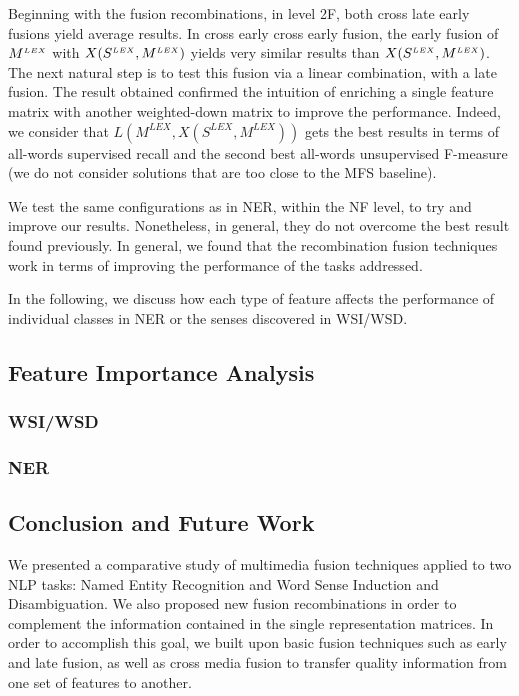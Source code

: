Beginning with the fusion recombinations, in level 2F, both cross late early fusions yield average results. In cross early cross early fusion, the early fusion of $M^{\scriptscriptstyle LEX}$ with  $X(S^{\scriptscriptstyle LEX}, M^{\scriptscriptstyle LEX})$ yields very similar results than $X(S^{\scriptscriptstyle LEX}, M^{\scriptscriptstyle LEX})$. The next natural step is to test this fusion via a linear combination, with a late fusion. The result obtained confirmed the intuition of enriching a single feature matrix with another weighted-down matrix to improve the performance. Indeed, we consider that $L(M^{LEX}, X(S^{LEX}, M^{LEX}))$ gets the best results in terms of all-words supervised recall and the second best all-words unsupervised F-measure (we do not consider solutions that are too close to the MFS baseline). 

We test the same configurations as in NER, within the NF level, to try and improve our results. Nonetheless, in general, they do not overcome the best result found previously.
In general, we found that the recombination fusion techniques work in terms of improving the performance of the tasks addressed.

In the following, we discuss how each type of feature affects the performance of individual classes in NER or the senses discovered in WSI/WSD.

\subsection{Feature Importance Analysis}
\subsubsection{WSI/WSD}
\subsubsection{NER}

\subsection{Conclusion and Future Work}
\label{chap6:conclusion}
We presented  a comparative study of multimedia fusion techniques applied to two NLP tasks: Named Entity Recognition and Word Sense Induction and Disambiguation. We also proposed new fusion recombinations in order to complement the information contained in the single representation matrices. In order to accomplish this goal, we built upon basic fusion techniques such as early and late fusion, as well as cross media fusion to transfer quality information from one set of features to another. 

